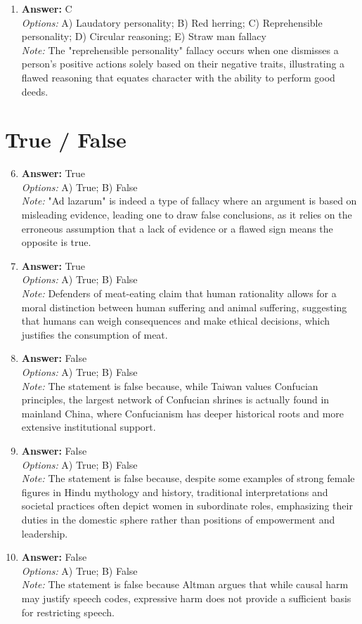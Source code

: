 \documentclass[12pt]{article}
\begin{document}
\begin{enumerate}[label=\arabic*.]
\item \textbf{Answer:} C
\\ \textit{Options:} A) Laudatory personality; B) Red herring; C) Reprehensible personality; D) Circular reasoning; E) Straw man fallacy
\\ \textit{Note:} The "reprehensible personality" fallacy occurs when one dismisses a person's positive actions solely based on their negative traits, illustrating a flawed reasoning that equates character with the ability to perform good deeds.
\end{enumerate}

\section*{True / False}
\begin{enumerate}[label=\arabic*.]
\setcounter{enumi}{5}
\item \textbf{Answer:} True
\\ \textit{Options:} A) True; B) False
\\ \textit{Note:} "Ad lazarum" is indeed a type of fallacy where an argument is based on misleading evidence, leading one to draw false conclusions, as it relies on the erroneous assumption that a lack of evidence or a flawed sign means the opposite is true.
\item \textbf{Answer:} True
\\ \textit{Options:} A) True; B) False
\\ \textit{Note:} Defenders of meat-eating claim that human rationality allows for a moral distinction between human suffering and animal suffering, suggesting that humans can weigh consequences and make ethical decisions, which justifies the consumption of meat.
\item \textbf{Answer:} False
\\ \textit{Options:} A) True; B) False
\\ \textit{Note:} The statement is false because, while Taiwan values Confucian principles, the largest network of Confucian shrines is actually found in mainland China, where Confucianism has deeper historical roots and more extensive institutional support.
\item \textbf{Answer:} False
\\ \textit{Options:} A) True; B) False
\\ \textit{Note:} The statement is false because, despite some examples of strong female figures in Hindu mythology and history, traditional interpretations and societal practices often depict women in subordinate roles, emphasizing their duties in the domestic sphere rather than positions of empowerment and leadership.
\item \textbf{Answer:} False
\\ \textit{Options:} A) True; B) False
\\ \textit{Note:} The statement is false because Altman argues that while causal harm may justify speech codes, expressive harm does not provide a sufficient basis for restricting speech.
\end{enumerate}
\end{document}
